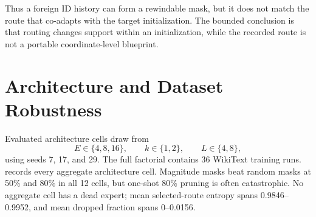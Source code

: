 \documentclass{article}
\begin{document}
\begin{table}[t]
\centering
\scriptsize
\caption{Cross-initialization full-budget retraining at the 10\% rewind. Values
are two-target means $\pm$ population SD.}
\label{tab:app_cross_init_rewind}
\end{table}

Thus a foreign ID history can form a rewindable mask, but it does not match the
route that co-adapts with the target initialization. The bounded conclusion is
that routing changes support within an initialization, while the recorded route
is not a portable coordinate-level blueprint.

\section{Architecture and Dataset Robustness}
\label{app:robustness}

Evaluated architecture cells draw from
\begin{equation}
E\in\{4,8,16\},
\qquad
k\in\{1,2\},
\qquad
L\in\{4,8\},
\label{eq:app_architecture_grid}
\end{equation}
using seeds 7, 17, and 29. The full factorial contains 36 WikiText training
runs.  records every aggregate architecture
cell. Magnitude masks beat random masks at 50\% and 80\% in all 12 cells, but
one-shot 80\% pruning is often catastrophic. No aggregate cell has a dead
expert; mean selected-route entropy spans 0.9846--0.9952, and mean dropped
fraction spans 0--0.0156.
\end{document}
